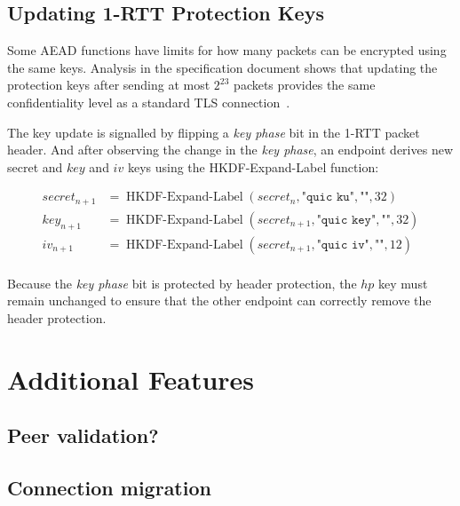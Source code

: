 
\subsection{Updating 1-RTT Protection Keys}

Some AEAD functions have limits for how many packets can be encrypted using the same keys. Analysis
in the specification document shows that updating the protection keys after sending at most
$2^{23}$ packets provides the same confidentiality level as a standard TLS connection~\cite{draft-ietf-quic-tls}.

The key update is signalled by flipping a \textit{key phase} bit in the 1-RTT packet header. And
after observing the change in the \textit{key phase}, an endpoint derives new secret and $key$ and
$iv$ keys using the HKDF-Expand-Label function:

\begin{equation*}
  \begin{split}
  secret_{n+1} & = \operatorname{HKDF-Expand-Label}(secret_{n}, \texttt{"quic ku"}, \texttt{""}, 32) \\
  key_{n+1} & = \operatorname{HKDF-Expand-Label}(secret_{n+1}, \texttt{"quic key"}, \texttt{""}, 32) \\
  iv_{n+1}  & = \operatorname{HKDF-Expand-Label}(secret_{n+1}, \texttt{"quic iv"}, \texttt{""}, 12)  \\
  \end{split}
\end{equation*}

Because the \textit{key phase} bit is protected by header protection, the $hp$ key must remain
unchanged to ensure that the other endpoint can correctly remove the header protection.

\section{Additional Features}

\subsection{Peer validation?}

\subsection{Connection migration}
